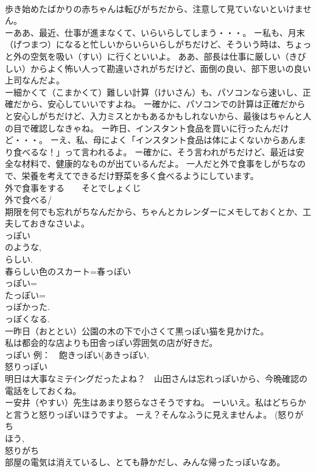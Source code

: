\documentclass[8pt]{extreport}
\begin{document}
\begin{CJK}{UTF8}{min}
\\	歩き始めたばかりの赤ちゃんは転びがちだから、注意して見ていないといけません。
\\	ーああ、最近、仕事が進まなくて、いらいらしてしまう・・・。 ー私も、月末（げつまつ）になると忙しいからいらいらしがちだけど、そういう時は、ちょっと外の空気を吸い（すい）に行くといいよ。 ああ、部長は仕事に厳しい（きびしい）からよく怖い人って勘違いされがちだけど、面倒の良い、部下思いの良い上司なんだよ。　
\\	ー細かくて（こまかくて）難しい計算（けいさん）も、パソコンなら速いし、正確だから、安心していいですよね。 ー確かに、パソコンでの計算は正確だからと安心しがちだけど、入力ミスとかもあるかもしれないから、最後はちゃんと人の目で確認しなきゃね。 ー昨日、インスタント食品を買いに行ったんだけど・・・。 ーえ、私、母によく「インスタント食品は体によくないからあんまり食べるな！」って言われるよ。 ー確かに、そう言われがちだけど、最近は安全な材料で、健康的なものが出ているんだよ。 一人だと外で食事をしがちなので、栄養を考えてできるだけ野菜を多く食べるようにしています。 
\\	外で食事をする　　そとでしょくじ 
\\	外で食べる/
\\	期限を何でも忘れがちなんだから、ちゃんとカレンダーにメモしておくとか、工夫しておきなさいよ。 
\\	っぽい 
\\	のような, 
\\	らしい. 
\\	春らしい色のスカート=春っぽい 
\\	っぽい= 
\\	たっぽい= 
\\	っぽかった. 
\\	っぽくなる. 
\\	一昨日（おととい）公園の木の下で小さくて黒っぽい猫を見かけた。 
\\	私は都会的な店よりも田舎っぽい雰囲気の店が好きだ。 
\\	っぽい 例：　飽きっぽい(あきっぽい, 
\\	怒りっぽい 
\\	明日は大事なミテｲングだったよね？　山田さんは忘れっぽいから、今晩確認の電話をしておくね。 
\\	ー安井（やすい）先生はあまり怒らなさそうですね。 ーいいえ。私はどちらかと言うと怒りっぽいほうですよ。 ーえ？そんなふうに見えませんよ。 (怒りがち 
\\	ほう, 
\\	怒りがち 
\\	部屋の電気は消えているし、とても静かだし、みんな帰ったっぽいなあ。 

\end{CJK}
\end{document}
